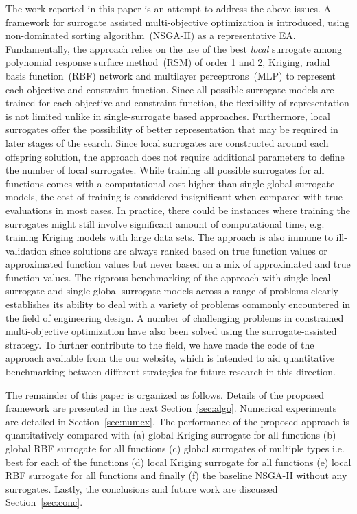 The work reported in this paper is an attempt to address the above issues. A framework for surrogate assisted multi-objective optimization is introduced, using non-dominated sorting algorithm~(NSGA-II) as a representative EA. Fundamentally, the approach relies on the use of the best \textit{local} surrogate among polynomial response surface method~(RSM) of order 1 and 2, Kriging,  radial basis function~(RBF) network and multilayer perceptrons~(MLP) to represent each objective and constraint function. Since all possible surrogate models are trained for each objective and constraint function, the flexibility of representation is not limited unlike in single-surrogate based approaches. Furthermore, local surrogates offer the possibility of better representation that may be required in later stages of the search. Since local surrogates are constructed around each offspring solution, the approach does not require additional parameters to define the number of local surrogates. While training all possible surrogates for all functions comes with a computational cost higher than single global surrogate models, the cost of training is considered insignificant when compared with true evaluations in most cases. In practice, there could be instances where training the surrogates might still involve significant amount of computational time, e.g. training Kriging models with large data sets. The approach is also immune to ill-validation since solutions are always ranked based on true function values or approximated function values but never based on a mix of approximated and true function values. The rigorous benchmarking of the approach with single local surrogate and single global surrogate models across a range of problems clearly establishes its ability to deal with a variety of problems commonly encountered in the field of engineering design. A number of challenging problems in constrained multi-objective optimization have also been solved using the surrogate-assisted strategy. To further contribute to the field, we have made the code of the approach available from the our website, which is intended to aid quantitative benchmarking between different strategies for future research in this direction. 

The remainder of this paper is organized as follows. Details of the proposed framework are presented in the next Section~\ref{sec:algo}. Numerical experiments are detailed in Section~\ref{sec:numex}. The performance of the proposed approach is quantitatively compared with (a) global Kriging surrogate for all functions (b) global RBF surrogate for all functions (c) global surrogates of multiple types i.e. best for each of the functions (d) local Kriging surrogate for all functions (e) local RBF surrogate for all functions and finally (f) the baseline NSGA-II without any surrogates. Lastly, the conclusions and future work are discussed Section~\ref{sec:conc}.

